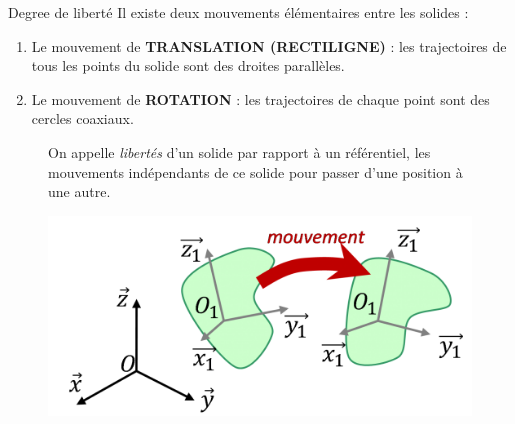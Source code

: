 \documentclass[
  ignorenonframetext,
  aspectratio=169,
  c]{beamer}
\providecommand{\tightlist}{%
  \setlength{\itemsep}{0pt}\setlength{\parskip}{0pt}}\usepackage{longtable,booktabs,array}
\begin{document}
\begin{frame}{Degree de liberté}
Il existe deux mouvements élémentaires entre les solides :

\begin{enumerate}
\tightlist
\item
  Le mouvement de \textbf{TRANSLATION (RECTILIGNE)} : les trajectoires
  de tous les points du solide sont des droites parallèles.
\item
  Le mouvement de \textbf{ROTATION} : les trajectoires de chaque point
  sont des cercles coaxiaux.
\end{enumerate}

\begin{figure}

\begin{minipage}{0.70\linewidth}
On appelle \emph{libertés} d'un solide par rapport à un référentiel, les
mouvements indépendants de ce solide pour passer d'une position à une
autre.\end{minipage}%
%
\begin{minipage}{0.30\linewidth}
\begin{center}
\includegraphics[width=1\textwidth,height=\textheight]{CM3/Repere-02.png}
\end{center}
\end{minipage}%

\end{figure}%
\end{frame}
\end{document}
